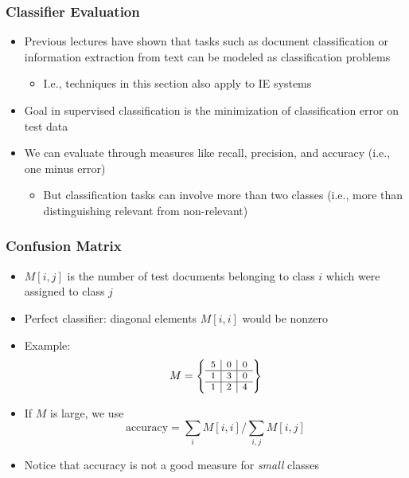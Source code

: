 \documentclass[svgnames]{beamer}
\begin{document}
\begin{frame} \frametitle{Classifier Evaluation}
  
  \begin{itemize}
  \item Previous lectures have shown that tasks such as document classification or information extraction from text can be modeled as classification problems
  \begin{itemize}
  \item I.e., techniques in this section also apply to IE systems
  \end{itemize}  

  \item Goal in supervised classification is the minimization of classification error on test data
  
  \item We can evaluate through measures like recall, precision, and accuracy (i.e., one minus error)
  \begin{itemize}
  \item But classification tasks can involve more than two classes (i.e., more than distinguishing relevant from non-relevant)
  \end{itemize}  
  \end{itemize}

 \end{frame}


\begin{frame} \frametitle{Confusion Matrix}
  
 \begin{itemize}
 \item $M[i,j]$ is the number of test documents belonging to class $i$ which
     were assigned to class $j$
 \item Perfect classifier: diagonal elements $M[i,i]$ would be nonzero
 \item Example:
     \begin{displaymath}
         \footnotesize
         M = \left\{
             \begin{array}{c|c|c}
               5 & 0 & 0 \\\hline
               1 & 3 & 0 \\\hline
               1 & 2 & 4
             \end{array}
         \right\}
     \end{displaymath}
 \item If $M$ is large, we use
     \begin{displaymath}
         \text{accuracy} = \sum_i M[i,i] / \sum_{i,j} M[i,j]
     \end{displaymath}
 \item Notice that accuracy is not a good measure for {\it small} classes
 \end{itemize}

\end{frame}
\end{document}
